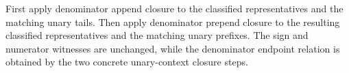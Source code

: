 First apply denominator append closure to the classified representatives and
the matching unary tails. Then apply denominator prepend closure to the
resulting classified representatives and the matching unary prefixes. The sign
and numerator witnesses are unchanged, while the denominator endpoint relation
is obtained by the two concrete unary-context closure steps.
